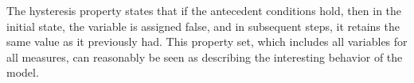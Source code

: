 \noindent The hysteresis property states that if the antecedent conditions hold, then in the initial state, the {\small{\doion}}
variable is assigned false, and in subsequent steps, it retains the same value as it previously had.  %
This property set, which includes all variables for all measures, can reasonably be seen as describing the interesting behavior of the model.

%
